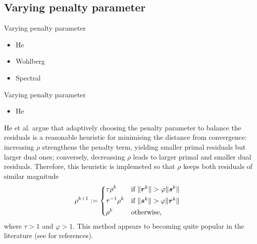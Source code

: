 \documentclass[8pt,red]{beamer}
\theoremstyle{plain}
\theoremstyle{definition}
\theoremstyle{remark}
\newcommand{\bi}[1]{\ensuremath{\boldsymbol{#1}}}
\begin{document}
\subsection{Varying penalty parameter}

\begin{frame}{Varying penalty parameter}
\begin{itemize}
\item He
\item Wohlberg
\item Spectral
\end{itemize}
\end{frame}

\begin{frame}{Varying penalty parameter}
\begin{itemize}
\item He
\end{itemize}
He et al. \citep{He2000} argue that adaptively choosing the penalty parameter to balance the residuals is a reasonable heuristic for minimising the distance from convergence: increasing $\rho$ strengthens the penalty term, yielding smaller primal residuals but larger dual ones; conversely, decreassing $\rho$ leads to larger primal and smaller dual residuals. Therefore, this heuristic is implemeted so that $\rho$ keeps both residuals of similar magnitude
\begin{align}
  \rho^{k+1} := 
  \begin{dcases*}
	\tau \rho^{k}
    & if $ \| \bi{r}^{k} \| > \varphi \| \bi{s}^{k} \|$ \\
    \tau^{-1} \rho^{k}
    & if $ \| \bi{s}^{k} \| > \varphi \| \bi{r}^{k} \|$ \\
    \rho^{k}
    & otherwise, \\
  \end{dcases*}  
\end{align}
where $\tau > 1$ and $\varphi > 1$. This method appears to becoming quite popular in the literature (see \citep{wohlberg2017admm} for references).
\end{frame}
\end{document}
